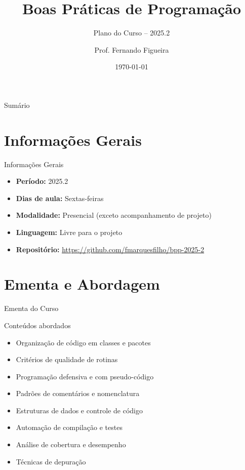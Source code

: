 \documentclass[10pt, aspectratio=169]{beamer}
\title{Boas Práticas de Programação}
\subtitle{Plano do Curso -- 2025.2}
\author{Prof. Fernando Figueira}
\institute{DIMAp -- UFRN}
\date{\today}
\begin{document}
\begin{frame}
\titlepage
\end{frame}

\begin{frame}{Sumário}
\tableofcontents
\end{frame}

\section{Informações Gerais}
\begin{frame}{Informações Gerais}
\begin{itemize}
    \item \textbf{Período:} 2025.2
    \item \textbf{Dias de aula:} Sextas-feiras
    \item \textbf{Modalidade:} Presencial (exceto acompanhamento de projeto)
    \item \textbf{Linguagem:} Livre para o projeto
    \item \textbf{Repositório:} \url{https://github.com/fmarquesfilho/bpp-2025-2}
\end{itemize}
\end{frame}

\section{Ementa e Abordagem}
\begin{frame}{Ementa do Curso}
\begin{block}{Conteúdos abordados}
\begin{itemize}
    \item Organização de código em classes e pacotes
    \item Critérios de qualidade de rotinas
    \item Programação defensiva e com pseudo-código
    \item Padrões de comentários e nomenclatura
    \item Estruturas de dados e controle de código
    \item Automação de compilação e testes
    \item Análise de cobertura e desempenho
    \item Técnicas de depuração
\end{itemize}
\end{block}
\end{frame}
\end{document}
